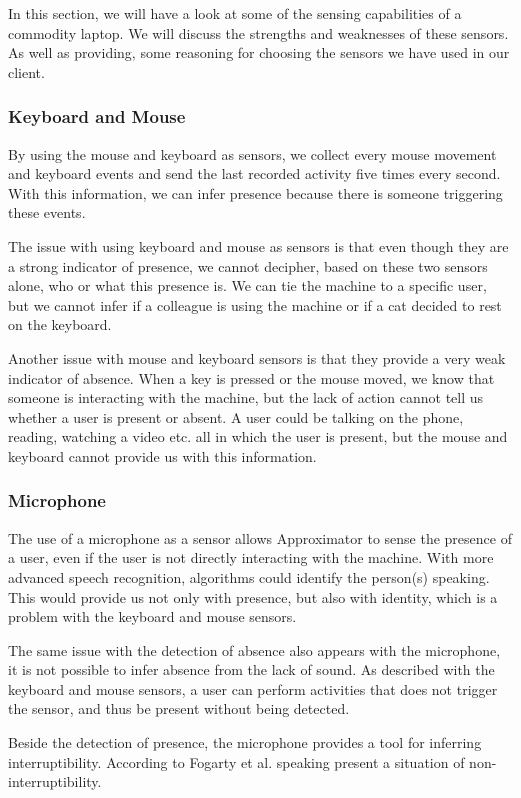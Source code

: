 \documentclass{sigchi}
\begin{document}
In this section, we will have a look at some of the sensing capabilities of a commodity laptop.
We will discuss the strengths and weaknesses of these sensors.
As well as providing, some reasoning for choosing the sensors we have used in our client.

\subsubsection{Keyboard and Mouse}
By using the mouse and keyboard as sensors, we collect every mouse movement and keyboard events and send the last recorded activity five times every second.
With this information, we can infer presence because there is someone triggering these events.

The issue with using keyboard and mouse as sensors is that even though they are a strong indicator of presence, we cannot decipher, based on these two sensors alone, who or what this presence is.
We can tie the machine to a specific user, but we cannot infer if a colleague is using the machine or if a cat decided to rest on the keyboard.

Another issue with mouse and keyboard sensors is that they provide a very weak indicator of absence.
When a key is pressed or the mouse moved, we know that someone is interacting with the machine, but the lack of action cannot tell us whether a user is present or absent.
A user could be talking on the phone, reading, watching a video etc. all in which the user is present, but the mouse and keyboard cannot provide us with this information.

\subsubsection{Microphone}
The use of a microphone as a sensor allows Approximator to sense the presence of a user, even if the user is not directly interacting with the machine.
With more advanced speech recognition, algorithms could identify the person(s) speaking.
This would provide us not only with presence, but also with identity, which is a problem with the keyboard and mouse sensors.

The same issue with the detection of absence also appears with the microphone, it is not possible to infer absence from the lack of sound.
As described with the keyboard and mouse sensors, a user can perform activities that does not trigger the sensor, and thus be present without being detected.

Beside the detection of presence, the microphone provides a tool for inferring interruptibility.
According to Fogarty et al. \cite{fogarty2005predicting} speaking present a situation of non-interruptibility.
\end{document}
